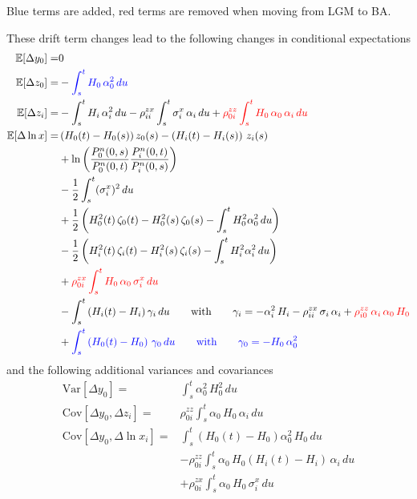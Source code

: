 \documentclass[12pt, a4paper]{article}
\newcommand\E{\ensuremath{\mathbb{E}}}
\begin{document}
{\begin{appendix}
Blue terms are {\color{blue}added}, red terms are {\color{red}removed} when moving from LGM to BA.

\medskip\noindent

These drift term changes lead to the following changes in conditional expectations 
\begin{align*}
\E[\Delta y_0] =& 0 \\
\E[\Delta z_0] =& - {\color{blue}\int_s^t H_0\,\alpha_0^2\,du}  \\
\E[\Delta z_i] =& - \int_s^t H_i\,\alpha_i^2\,du 
  - \rho^{zx}_{ii}\int_s^t \sigma_i^x\,\alpha_i\,du
  + {\color{red}\rho^{zz}_{0i} \int_s^t H_0\,\alpha_0\,\alpha_i\,du } \\
\E[\Delta \ln x] 
  =& \left(H_0(t)-H_0(s)\right) z_0(s) -\left(H_i(t)-H_i(s)\right)\,z_i(s)\\
  &+ \ln \left( \frac{P^n_0(0,s)}{P^n_0(0,t)} \frac{P^n_i(0,t)}{P^n_i(0,s)}\right) \\
  & - \frac12 \int_s^t (\sigma^x_i)^2\,du \\
  &+\frac12 \left(H^2_0(t)\, \zeta_0(t) -  H^2_0(s) \,\zeta_0(s) - \int_s^t H_0^2 \alpha_0^2\,du\right)\\
  &-\frac12 \left(H^2_i(t) \,\zeta_i(t) -  H^2_i(s) \,\zeta_i(s) - \int_s^t H_i^2 \alpha_i^2\,du\right)\\
  & + {\color{red} \rho^{zx}_{0i} \int_s^t H_0\, \alpha_0\, \sigma^x_i\,du} \\
  &  - \int_s^t \left(H_i(t)-H_i\right)\gamma_i \,du \qquad\mbox{with}\qquad
  \gamma_i = -\alpha_i^2\,H_i -\rho_{ii}^{zx}\,\sigma_i\,\alpha_i + {\color{red}\rho_{i0}^{zz}\,\alpha_i\,\alpha_0\,H_0}   \\
  & + {\color{blue}\int_s^t \left(H_0(t)-H_0\right)\,\gamma_0 \,du \qquad \mbox{with}\qquad \gamma_0 = - H_0\,\alpha_0^2}
\end{align*}
and the following additional variances and covariances
\begin{align*}
\mathrm{Var}[\Delta y_0] =& \int_s^t \alpha_0^2\,H_0^2\,du \\
\mathrm{Cov}[\Delta y_0, \Delta z_i] =& \rho^{zz}_{0i} \int_s^t \alpha_0\,H_0\,\alpha_i\,du \\
\mathrm{Cov}[\Delta y_0, \Delta \ln x_i] =& \int_s^t \left(H_0(t)-H_0\right) \alpha_0^2\,H_0\,du \\
&  - \rho^{zz}_{0i}\int_s^t \alpha_0\,H_0\left(H_i(t)-H_i\right)\, \alpha_i \,du \\
&  +\rho^{zx}_{0i}\int_s^t \alpha_0 \, H_0\,\sigma^x_i \,du 

\end{align*}
\end{appendix}}
\end{document}

